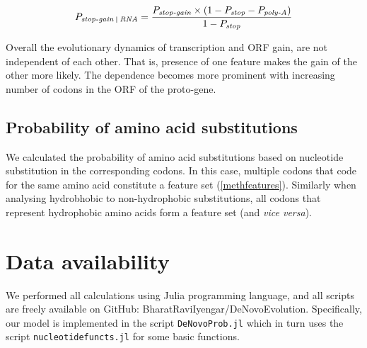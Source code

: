 \documentclass[12pt,a4paper]{article}
\begin{document}
$$P_\textit{stop-gain \vline\ RNA} = \frac{P_\textit{stop-gain}\times(1- P_\textit{stop} - P_\textit{poly-A})}{1- P_\textit{stop}}$$

Overall the evolutionary dynamics of transcription and ORF gain, are not independent of each other. That is, presence of one feature makes the gain of the other more likely. The dependence becomes more prominent with increasing number of codons in the ORF of the proto-gene.

\subsection{Probability of amino acid substitutions}

We calculated the probability of amino acid substitutions based on nucleotide substitution in the corresponding codons. In this case, multiple codons that code for the same amino acid constitute a feature set (\autoref{methfeatures}). Similarly when analysing hydrobhobic to non-hydrophobic substitutions, all codons that represent hydrophobic amino acids form a feature set (and \textit{vice versa}).

\section{Data availability}
We performed all calculations using Julia programming language, and all scripts are freely available on GitHub: BharatRaviIyengar/DeNovoEvolution. Specifically, our model is implemented in the script \texttt{DeNovoProb.jl} which in turn uses the script \texttt{nucleotidefuncts.jl} for some basic functions.



\small

\end{document}
